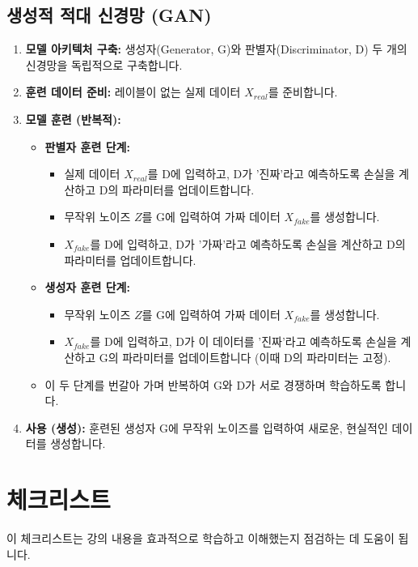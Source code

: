 \documentclass[11pt,a4paper]{article}
\begin{document}
\subsection{생성적 적대 신경망 (GAN)}
\begin{enumerate}
    \item \textbf{모델 아키텍처 구축:} 생성자(Generator, G)와 판별자(Discriminator, D) 두 개의 신경망을 독립적으로 구축합니다.
    \item \textbf{훈련 데이터 준비:} 레이블이 없는 실제 데이터 $X_{real}$를 준비합니다.
    \item \textbf{모델 훈련 (반복적):}
    \begin{itemize}
        \item \textbf{판별자 훈련 단계:}
        \begin{itemize}
            \item 실제 데이터 $X_{real}$를 D에 입력하고, D가 '진짜'라고 예측하도록 손실을 계산하고 D의 파라미터를 업데이트합니다.
            \item 무작위 노이즈 $Z$를 G에 입력하여 가짜 데이터 $X_{fake}$를 생성합니다.
            \item $X_{fake}$를 D에 입력하고, D가 '가짜'라고 예측하도록 손실을 계산하고 D의 파라미터를 업데이트합니다.
        \end{itemize}
        \item \textbf{생성자 훈련 단계:}
        \begin{itemize}
            \item 무작위 노이즈 $Z$를 G에 입력하여 가짜 데이터 $X_{fake}$를 생성합니다.
            \item $X_{fake}$를 D에 입력하고, D가 이 데이터를 '진짜'라고 예측하도록 손실을 계산하고 G의 파라미터를 업데이트합니다 (이때 D의 파라미터는 고정).
        \end{itemize}
        \item 이 두 단계를 번갈아 가며 반복하여 G와 D가 서로 경쟁하며 학습하도록 합니다.
    \end{itemize}
    \item \textbf{사용 (생성):} 훈련된 생성자 G에 무작위 노이즈를 입력하여 새로운, 현실적인 데이터를 생성합니다.
\end{enumerate}

\newpage
\section*{체크리스트}

이 체크리스트는 강의 내용을 효과적으로 학습하고 이해했는지 점검하는 데 도움이 됩니다.
\end{document}
